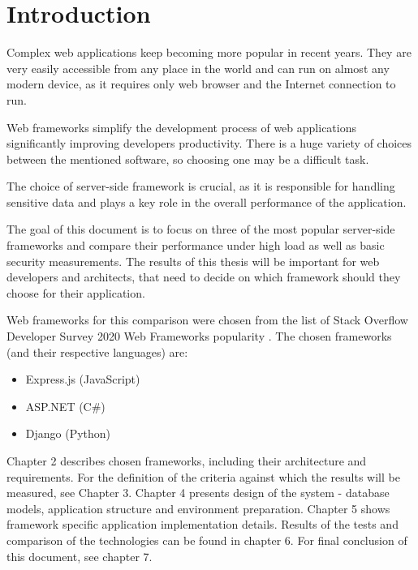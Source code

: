 
\chapter{Introduction}

Complex web applications keep becoming more popular in recent years. They are very easily accessible from any place in the world and can run on almost any modern device, as it requires only web browser and the Internet connection to run.

Web frameworks simplify the development process of web applications significantly improving developers productivity. There is a huge variety of choices between the mentioned software, so choosing one may be a difficult task.

The choice of server-side framework is crucial, as it is responsible for handling sensitive data and plays a key role in the overall performance of the application.

The goal of this document is to focus on three of the most popular server-side frameworks and compare their performance under high load as well as basic security measurements. The results of this thesis will be important for web developers and architects, that need to decide on which framework should they choose for their application.

Web frameworks for this comparison were chosen from the list of Stack Overflow Developer Survey 2020 Web Frameworks popularity \cite{devSurveyWeb}. The chosen frameworks (and their respective languages) are:
\begin{itemize}
    \item Express.js (JavaScript)
    \item ASP.NET (C\#)
    \item Django (Python)
\end{itemize}

Chapter 2 describes chosen frameworks, including their architecture and requirements. For the definition of the criteria against which the results will be measured, see Chapter 3. Chapter 4 presents design of the system - database models, application structure and environment preparation. Chapter 5 shows framework specific application implementation details. Results of the tests and comparison of the technologies can be found in chapter 6. For final conclusion of this document, see chapter 7.
